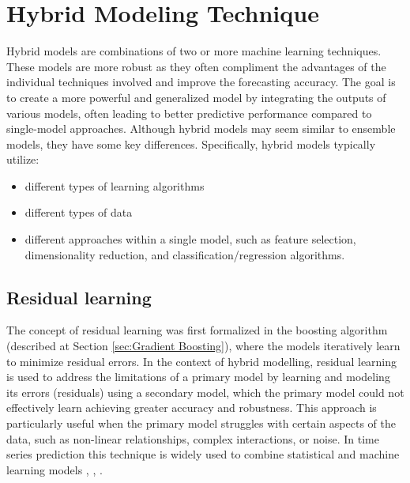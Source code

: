 \section{Hybrid Modeling Technique}
Hybrid models are combinations of two or more machine learning techniques. These models are more robust as they often compliment the advantages of the individual techniques involved and improve the forecasting accuracy. The goal is to create a more powerful and generalized model by integrating the outputs of various models, often leading to better predictive performance compared to single-model approaches. Although hybrid models may seem similar to ensemble models, they have some key differences. Specifically, hybrid models typically utilize: 
\begin{itemize}
    \item different types of learning algorithms 
    \item different types of data 
    \item different approaches within a single model, such as feature selection, dimensionality reduction, and classification/regression algorithms.
\end{itemize}

\subsection{Residual learning}
The concept of residual learning was first formalized in the boosting algorithm \cite{Friedman2001} (described at Section \ref{sec:Gradient Boosting}), where the models iteratively learn to minimize residual errors. In the context of hybrid modelling, residual learning is used to address the limitations of a primary model by learning and modeling its errors (residuals) using a secondary model,  which the primary model could not effectively learn  achieving greater accuracy and robustness. This approach is particularly useful when the primary model struggles with certain aspects of the data, such as non-linear relationships, complex interactions, or noise. In time series prediction this technique is widely used to combine statistical and machine learning models \cite{wang2018hybrid}, \cite{khashei2011hybridization}, \cite{liu2020arima_lstm}.







